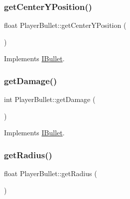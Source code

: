 \mbox{\label{class_player_bullet_a7ad2bc922595b9a11373fd42666926ef}} 
\subsubsection{\texorpdfstring{get\+Center\+Y\+Position()}{getCenterYPosition()}}
{\footnotesize\ttfamily float Player\+Bullet\+::get\+Center\+Y\+Position (\begin{DoxyParamCaption}{ }\end{DoxyParamCaption})\hspace{0.3cm}{\ttfamily [virtual]}}



Implements \hyperlink{class_i_bullet_a8245ed2bc72beed1d69547ce5f87a021}{I\+Bullet}.

\mbox{\label{class_player_bullet_a55375b5c3f4f87d00daba1cda12b1e79}} 
\subsubsection{\texorpdfstring{get\+Damage()}{getDamage()}}
{\footnotesize\ttfamily int Player\+Bullet\+::get\+Damage (\begin{DoxyParamCaption}{ }\end{DoxyParamCaption})\hspace{0.3cm}{\ttfamily [virtual]}}



Implements \hyperlink{class_i_bullet_ab6643a4ad3888ee4ebfbc3d445c4b73d}{I\+Bullet}.

\mbox{\label{class_player_bullet_a1ff56e38b1447500d2887b6fe1eeb674}} 
\subsubsection{\texorpdfstring{get\+Radius()}{getRadius()}}
{\footnotesize\ttfamily float Player\+Bullet\+::get\+Radius (\begin{DoxyParamCaption}{ }\end{DoxyParamCaption})\hspace{0.3cm}{\ttfamily [virtual]}}




